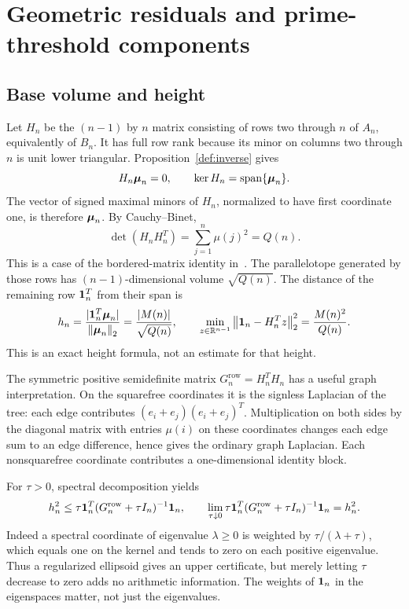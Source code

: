 \section{Geometric residuals and prime-threshold components}\label{sec:geometry}

\subsection{Base volume and height}

Let $H_n$ be the $(n-1)$ by $n$ matrix consisting of rows two through $n$ of $A_n$, equivalently of $B_n$. It has full row rank because its minor on columns two through $n$ is unit lower triangular. Proposition~\ref{def:inverse} gives
\[
 H_n\boldsymbol{\mu}_n=0,\qquad \ker H_n=\operatorname{span}\{\boldsymbol{\mu}_n\}.
\]
The vector of signed maximal minors of $H_n$, normalized to have first coordinate one, is therefore $\boldsymbol{\mu}_n$. By Cauchy--Binet,
\begin{equation}\label{geo:base}
 \det(H_nH_n^T)=\sum_{j=1}^n\mu(j)^2=Q(n).
\end{equation}
This is a case of the bordered-matrix identity in~\cite{kline2020b}. The parallelotope generated by those rows has $(n-1)$-dimensional volume $\sqrt{Q(n)}$. The distance of the remaining row $\mathbf{1}_n^T$ from their span is
\begin{equation}\label{geo:height}
 h_n=\frac{|\mathbf{1}_n^T\boldsymbol{\mu}_n|}{\left\lVert\boldsymbol{\mu}_n\right\rVert_2}
     =\frac{|M(n)|}{\sqrt{Q(n)}},\qquad
 \min_{z\in\mathbb R^{n-1}}\left\lVert\mathbf{1}_n-H_n^Tz\right\rVert_2^2
     =\frac{M(n)^2}{Q(n)}.
\end{equation}
This is an exact height formula, not an estimate for that height.

The symmetric positive semidefinite matrix $G_n^{\mathrm{row}}=H_n^TH_n$ has a useful graph interpretation. On the squarefree coordinates it is the signless Laplacian of the tree: each edge contributes $(e_i+e_j)(e_i+e_j)^T$. Multiplication on both sides by the diagonal matrix with entries $\mu(i)$ on these coordinates changes each edge sum to an edge difference, hence gives the ordinary graph Laplacian. Each nonsquarefree coordinate contributes a one-dimensional identity block.

For $\tau>0$, spectral decomposition yields
\begin{equation}\label{geo:resolvent}
 h_n^2\le\tau\mathbf{1}_n^T(G_n^{\mathrm{row}}+\tau I_n)^{-1}\mathbf{1}_n,
 \qquad
 \lim_{\tau\downarrow0}\tau\mathbf{1}_n^T(G_n^{\mathrm{row}}+\tau I_n)^{-1}\mathbf{1}_n=h_n^2.
\end{equation}
Indeed a spectral coordinate of eigenvalue $\lambda\ge0$ is weighted by $\tau/(\lambda+\tau)$, which equals one on the kernel and tends to zero on each positive eigenvalue. Thus a regularized ellipsoid gives an upper certificate, but merely letting $\tau$ decrease to zero adds no arithmetic information. The weights of $\mathbf{1}_n$ in the eigenspaces matter, not just the eigenvalues.

